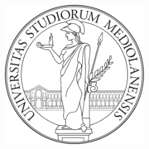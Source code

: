 
\renewcommand{\baselinestretch}{1}

\begin{titlepage}

\begin{center}

\begin{LARGE}
\textbf{\myUni}\\
\end{LARGE}

\vspace{10pt}

\begin{Large}
\textsc{\myDepartment}\\
\end{Large}

\vspace{10pt}

\begin{Large}
\textsc{\myFaculty}\\
\end{Large}

\vspace{30pt}
\begin{figure}[htbp]
\begin{center}
\includegraphics[height=6cm]{images/unimilogo.png}
\end{center}
\end{figure}
\vspace{20pt} 

\begin{LARGE}
\begin{center}
\textbf{\myTitle}\\
\end{center}
\end{LARGE}


\end{center}
\end{titlepage}
